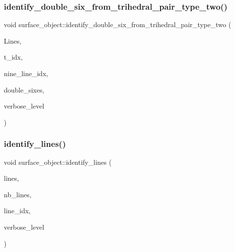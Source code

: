 \subsubsection{\texorpdfstring{identify\+\_\+double\+\_\+six\+\_\+from\+\_\+trihedral\+\_\+pair\+\_\+type\+\_\+two()}{identify\_double\_six\_from\_trihedral\_pair\_type\_two()}}
{\footnotesize\ttfamily void surface\+\_\+object\+::identify\+\_\+double\+\_\+six\+\_\+from\+\_\+trihedral\+\_\+pair\+\_\+type\+\_\+two (\begin{DoxyParamCaption}\item[{\mbox{\hyperlink{galois_8h_a09fddde158a3a20bd2dcadb609de11dc}{I\+NT}} $\ast$}]{Lines,  }\item[{\mbox{\hyperlink{galois_8h_a09fddde158a3a20bd2dcadb609de11dc}{I\+NT}}}]{t\+\_\+idx,  }\item[{\mbox{\hyperlink{galois_8h_a09fddde158a3a20bd2dcadb609de11dc}{I\+NT}} $\ast$}]{nine\+\_\+line\+\_\+idx,  }\item[{\mbox{\hyperlink{galois_8h_a09fddde158a3a20bd2dcadb609de11dc}{I\+NT}} $\ast$}]{double\+\_\+sixes,  }\item[{\mbox{\hyperlink{galois_8h_a09fddde158a3a20bd2dcadb609de11dc}{I\+NT}}}]{verbose\+\_\+level }\end{DoxyParamCaption})}

\mbox{\label{classsurface__object_a42a024ed43efea97d8de9ed3493b5a8e}} 
\subsubsection{\texorpdfstring{identify\+\_\+lines()}{identify\_lines()}}
{\footnotesize\ttfamily void surface\+\_\+object\+::identify\+\_\+lines (\begin{DoxyParamCaption}\item[{\mbox{\hyperlink{galois_8h_a09fddde158a3a20bd2dcadb609de11dc}{I\+NT}} $\ast$}]{lines,  }\item[{\mbox{\hyperlink{galois_8h_a09fddde158a3a20bd2dcadb609de11dc}{I\+NT}}}]{nb\+\_\+lines,  }\item[{\mbox{\hyperlink{galois_8h_a09fddde158a3a20bd2dcadb609de11dc}{I\+NT}} $\ast$}]{line\+\_\+idx,  }\item[{\mbox{\hyperlink{galois_8h_a09fddde158a3a20bd2dcadb609de11dc}{I\+NT}}}]{verbose\+\_\+level }\end{DoxyParamCaption})}

